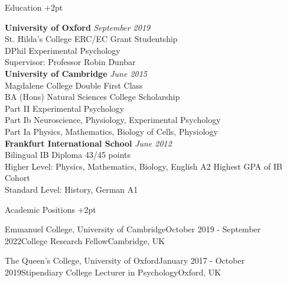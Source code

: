 \documentclass{resume} %
\begin{document}

\begin{rSection}{Education} \itemsep +2pt

{\bf University of Oxford} \hfill {\em September 2019} \\ 
St. Hilda's College \hfill {ERC/EC Grant Studentship}  \\
DPhil Experimental Psychology  \\
Supervisor: Professor Robin Dunbar \\

{\bf University of Cambridge} \hfill {\em June 2015} \\ 
Magdalene College \hfill {Double First Class} \\
BA (Hons) Natural Sciences  \hfill {College Scholarship} \\ 
Part II Experimental Psychology \\
Part Ib Neuroscience, Physiology, Experimental Psychology \\
Part Ia Physics, Mathematics, Biology of Cells, Physiology \\

{\bf Frankfurt International School} \hfill {\em June 2012} \\ 
Bilingual IB Diploma \hfill {43/45 points} \\
Higher Level: Physics, Mathematics, Biology, English A2  \hfill {Highest GPA of IB Cohort} \\ 
Standard Level: History, German A1 

\end{rSection}


\begin{rSection}{Academic Positions} \itemsep +2pt

\begin{rSubsection}{Emmanuel College, University of Cambridge}{October 2019 - September 2022}{College Research Fellow}{Cambridge, UK} 
\item[]\vspace{-1.5\baselineskip}
\end{rSubsection}


\begin{rSubsection}{The Queen's College, University of Oxford}{January 2017 - October 2019}{Stipendiary College Lecturer in Psychology}{Oxford, UK}
\item[]\vspace{-1.5\baselineskip}

\end{rSubsection}
\end{rSection}
\end{document}
